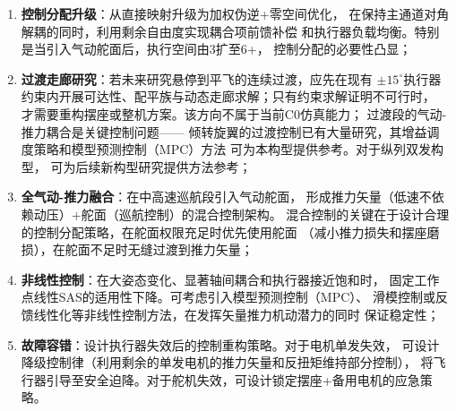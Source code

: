 \begin{enumerate}[label=(\arabic*)]
    \item \textbf{控制分配升级}：从直接映射升级为加权伪逆+零空间优化，
          在保持主通道对角解耦的同时，利用剩余自由度实现耦合项前馈补偿
          和执行器负载均衡。特别是当引入气动舵面后，执行空间由3扩至6+，
          控制分配的必要性凸显；
    \item \textbf{过渡走廊研究}：若未来研究悬停到平飞的连续过渡，应先在现有
          $\pm15^\circ$执行器约束内开展可达性、配平族与动态走廊求解；只有约束求解证明不可行时，
          才需要重构摆座或整机方案。该方向不属于当前C0仿真能力；
          过渡段的气动-推力耦合是关键控制问题——
          倾转旋翼的过渡控制已有大量研究，其增益调度策略和模型预测控制（MPC）方法
          可为本构型提供参考\cite{kang2009control,kim2003nonlinear}。对于纵列双发构型，
          可为后续新构型研究提供方法参考；
    \item \textbf{全气动-推力融合}：在中高速巡航段引入气动舵面，
          形成推力矢量（低速不依赖动压）+舵面（巡航控制）的混合控制架构。
          混合控制的关键在于设计合理的控制分配策略，在舵面权限充足时优先使用舵面
          （减小推力损失和摆座磨损），在舵面不足时无缝过渡到推力矢量；
    \item \textbf{非线性控制}：在大姿态变化、显著轴间耦合和执行器接近饱和时，
          固定工作点线性SAS的适用性下降。可考虑引入模型预测控制（MPC）、
          滑模控制或反馈线性化等非线性控制方法，在发挥矢量推力机动潜力的同时
          保证稳定性；
    \item \textbf{故障容错}：设计执行器失效后的控制重构策略。对于电机单发失效，
          可设计降级控制律（利用剩余的单发电机的推力矢量和反扭矩维持部分控制），
          将飞行器引导至安全迫降。对于舵机失效，可设计锁定摆座+备用电机的应急策略。
\end{enumerate}
